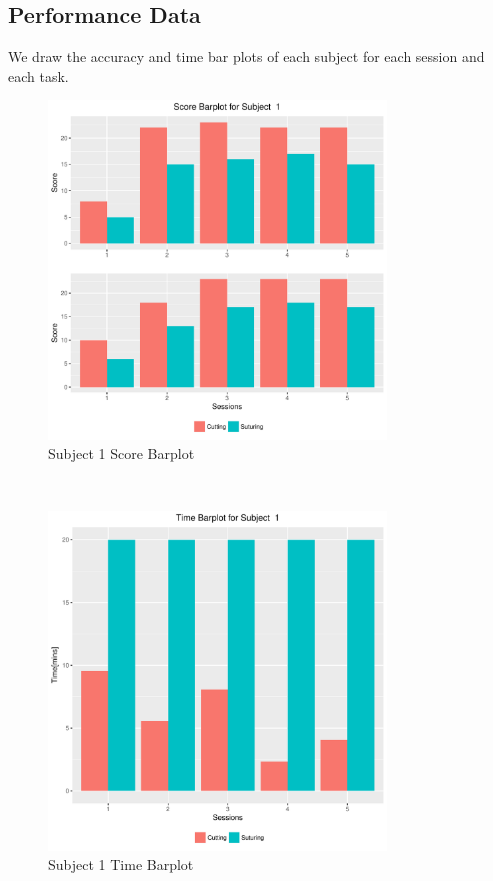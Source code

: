 \documentclass[12pt,epsf]{report}
\begin{document}
\subsection*{Performance Data}
We draw the accuracy and time bar plots of each subject for each session and each task.\\
\begin{figure}[!htb]
	\centering
	\includegraphics[width=0.8\textwidth]{1Score_barplot.pdf}
	\caption{Subject 1 Score Barplot}
	\centering
\end{figure}
\\
\begin{figure}[!htb]
	\centering
	\includegraphics[width=0.8\textwidth]{1Time_barplot.pdf}
	\caption{Subject 1 Time Barplot}
	\centering
\end{figure}\\
\end{document}
